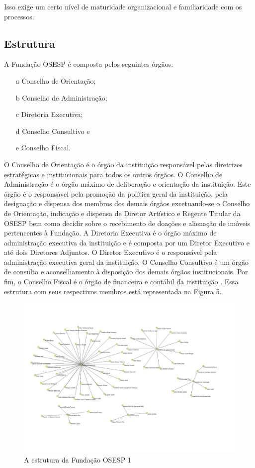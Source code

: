 \documentclass[a4paper, 12pt, openright, oneside, german, french, english, brazil]{abntex2}
\begin{document}
	Isso exige um certo nível de maturidade organizacional e familiaridade com os processos.
	
	\subsection{Estrutura}
	
	A Fundação OSESP é composta pelos seguintes órgãos:
	
	\begin{enumerate}
		\item[a] Conselho de Orientação;
		\item[b] Conselho de Administração;
		\item[c] Diretoria Executiva;
		\item[d] Conselho Consultivo e
		\item[e] Conselho Fiscal.
	\end{enumerate}
	
	O Conselho de Orientação é o órgão da instituição responsável pelas diretrizes estratégicas e institucionais para todos os outros órgãos. O Conselho de Administração é o órgão máximo de deliberação e orientação da instituição. Este órgão é o responsável pela promoção da política geral da instituição, pela designação e dispensa dos membros dos demais órgãos excetuando-se o Conselho de Orientação, indicação e dispensa de Diretor Artístico e Regente Titular da OSESP bem como decidir sobre o recebimento de doações e alienação de imóveis pertencentes à Fundação. A Diretoria Executiva é o órgão máximo de administração executiva da instituição e é composta por um Diretor Executivo e até dois Diretores Adjuntos. O Diretor Executivo é o responsável pela administração executiva geral da instituição. O Conselho Consultivo é um órgão de consulta e aconselhamento à disposição dos demais órgãos institucionais. Por fim, o Conselho Fiscal é o órgão de financeira e contábil da instituição \cite{osesp2013estatuto}. Essa estrutura com seus respectivos membros está representada na Figura 5.
	
	\begin{figure}
		\centering
		\caption{A estrutura da Fundação OSESP 1}
		\includegraphics[scale=0.8]{OSESP_conselhos_pajek.pdf}
	\end{figure}
	
\end{document}
